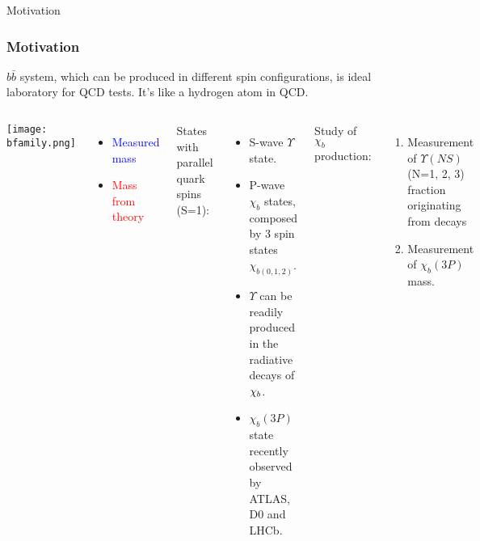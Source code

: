 \begin{frame}{Motivation}

\frametitle{Motivation}
$b\bar{b}$ system, which can be produced in different spin configurations, is
ideal laboratory for QCD tests. It's like a hydrogen atom in QCD.
\begin{columns}[c]
\texttt{[image: bfamily.png]}
\begin{itemize}
  \item \textcolor{blue}{Measured mass}
  \item \textcolor{red}{Mass from theory}
\end{itemize}
\fontsize{9pt}{7.2}\selectfont
States with parallel quark spins (S=1):
\begin{itemize}
  \item S-wave $\Upsilon$ state.
  \item P-wave $\chi_{b}$ states, composed by 3 spin states $\chi_{b(0,1,2)}$. 
  \item $\Upsilon$ can be readily produced in the radiative decays of $\chi_{b}$.
  \item $\chi_{b}(3P)$ state recently observed by ATLAS, D0 and LHCb.
\end{itemize}
Study of $\chi_{b}$ production:
\begin{enumerate}
  \item Measurement of  $\Upsilon(NS)$ (N=1, 2, 3) fraction  originating from \chib decays
  \item Measurement of $\chi_{b}(3P)$ mass.
\end{enumerate}
\end{columns}

\end{frame}
